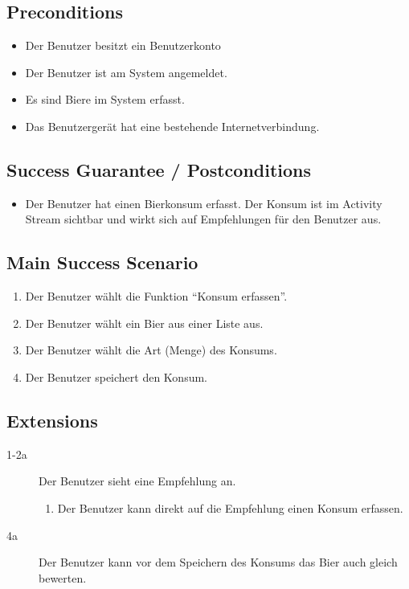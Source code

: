 \documentclass[10pt,a4paper]{scrartcl}
\begin{document}
\subsection*{Preconditions}

\begin{itemize}
\item Der Benutzer besitzt ein Benutzerkonto
\item Der Benutzer ist am System angemeldet.
\item Es sind Biere im System erfasst.
\item Das Benutzergerät hat eine bestehende Internetverbindung.
\end{itemize}


\subsection*{Success Guarantee / Postconditions}
\begin{itemize}
\item Der Benutzer hat einen Bierkonsum erfasst. Der Konsum ist im Activity Stream sichtbar und wirkt sich auf Empfehlungen für den Benutzer aus.
\end{itemize}


\subsection*{Main Success Scenario}

\begin{enumerate}
\item Der Benutzer wählt die Funktion ``Konsum erfassen''.
\item Der Benutzer wählt ein Bier aus einer Liste aus.
\item Der Benutzer wählt die Art (Menge) des Konsums.
\item Der Benutzer speichert den Konsum.
\end{enumerate}


\subsection*{Extensions}

\begin{description}
\item[1-2a] Der Benutzer sieht eine Empfehlung an.
	\begin{enumerate}
	\item Der Benutzer kann direkt auf die Empfehlung einen Konsum erfassen.
	\end{enumerate}
\item[4a] Der Benutzer kann vor dem Speichern des Konsums das Bier auch gleich bewerten.

\end{description}
\end{document}
